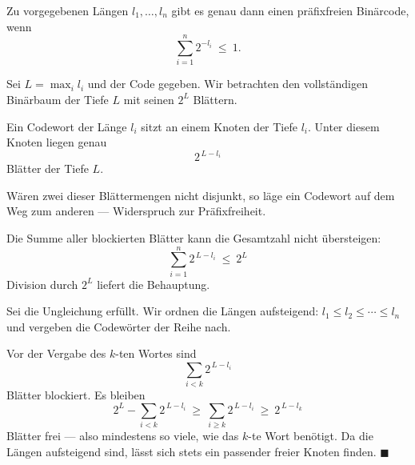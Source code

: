 \begin{merksatz}
Zu vorgegebenen Längen $l_1,\ldots,l_n$ gibt es genau dann einen präfixfreien Binärcode, wenn
\[ \sum_{i=1}^{n} 2^{-l_i} \ \le\ 1 . \]

Sei $L = \max_i l_i$ und der Code gegeben. Wir betrachten den vollständigen Binärbaum der Tiefe $L$ mit seinen $2^{L}$ Blättern.

Ein Codewort der Länge $l_i$ sitzt an einem Knoten der Tiefe $l_i$. Unter diesem Knoten liegen genau
\[ 2^{\,L-l_i} \]
Blätter der Tiefe $L$.

Wären zwei dieser Blättermengen nicht disjunkt, so läge ein Codewort auf dem Weg zum anderen --- Widerspruch zur Präfixfreiheit.

Die Summe aller blockierten Blätter kann die Gesamtzahl nicht übersteigen:
\[ \sum_{i=1}^{n} 2^{\,L-l_i} \ \le\ 2^{L} \]
Division durch $2^{L}$ liefert die Behauptung. \checkmark

Sei die Ungleichung erfüllt. Wir ordnen die Längen aufsteigend: $l_1 \le l_2 \le \cdots \le l_n$ und vergeben die Codewörter der Reihe nach.

Vor der Vergabe des $k$-ten Wortes sind
\[ \sum_{i<k} 2^{\,L-l_i} \]
Blätter blockiert. Es bleiben
\[ 2^{L} - \sum_{i<k} 2^{\,L-l_i} \ \ge\ \sum_{i \ge k} 2^{\,L-l_i} \ \ge\ 2^{\,L-l_k} \]
Blätter frei --- also mindestens so viele, wie das $k$-te Wort benötigt. Da die Längen aufsteigend sind, lässt sich stets ein passender freier Knoten finden. $\blacksquare$

\begin{center}
\begin{minipage}{0.88\textwidth}
\end{minipage}
\end{center}
\end{merksatz}


